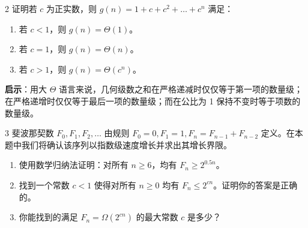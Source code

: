 \begin{exercise}{2}
证明若 $c$ 为正实数，则 $g(n) = 1 + c + c^2 + \dots + c^n$ 满足：
\begin{enumerate}
    \item[(a)] 若 $c < 1$，则 $g(n) = \Theta(1)$。
    \item[(b)] 若 $c = 1$，则 $g(n) = \Theta(n)$。
    \item[(c)] 若 $c > 1$，则 $g(n) = \Theta(c^n)$。
\end{enumerate}
\textbf{启示}：用大 $\Theta$ 语言来说，几何级数之和在严格递减时仅仅等于第一项的数量级；在严格递增时仅仅等于最后一项的数量级；而在公比为 1 保持不变时等于项数的数量级。
\end{exercise}

\begin{exercise}{3}
斐波那契数 $F_0, F_1, F_2, \dots$ 由规则 $F_0 = 0, F_1 = 1, F_n = F_{n-1} + F_{n-2}$ 定义。在本题中我们将确认该序列以指数级速度增长并求出其增长界限。
\begin{enumerate}
    \item[(a)] 使用数学归纳法证明：对所有 $n \ge 6$，均有 $F_n \ge 2^{0.5n}$。
    \item[(b)] 找到一个常数 $c < 1$ 使得对所有 $n \ge 0$ 均有 $F_n \le 2^{cn}$。证明你的答案是正确的。
    \item[(c)] 你能找到的满足 $F_n = \Omega(2^{cn})$ 的最大常数 $c$ 是多少？
\end{enumerate}
\end{exercise}

